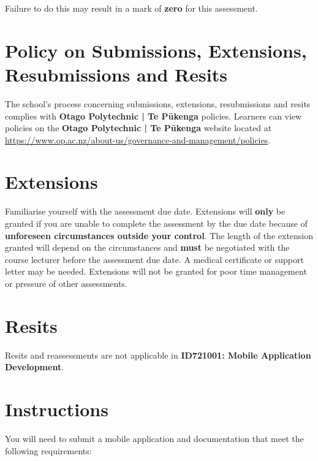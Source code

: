 \documentclass{article}
\begin{document}
 Failure to do this may result in a mark of \textbf{zero} for this assessment.

\section*{Policy on Submissions, Extensions, Resubmissions and Resits}
The school's process concerning submissions, extensions, resubmissions and resits complies with \textbf{Otago Polytechnic | Te Pūkenga} policies. Learners can view policies on the \textbf{Otago Polytechnic | Te Pūkenga} website located at \href{https://www.op.ac.nz/about-us/governance-and-management/policies}{https://www.op.ac.nz/about-us/governance-and-management/policies}.  

\section*{Extensions}
Familiarise yourself with the assessment due date. Extensions will \textbf{only} be granted if you are unable to complete the assessment by the due date because of \textbf{unforeseen circumstances outside your control}. The length of the extension granted will depend on the circumstances and \textbf{must} be negotiated with the course lecturer before the assessment due date. A medical certificate or support letter may be needed. Extensions will not be granted for poor time management or pressure of other assessments.

\section*{Resits}
Resits and reassessments are not applicable in \textbf{ID721001: Mobile Application Development}.

\section*{Instructions}
You will need to submit a mobile application and documentation that meet the following requirements:
\end{document}
